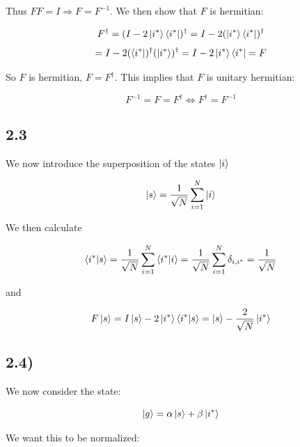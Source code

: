\documentclass[a4paper,norsk, 10pt]{article}
\begin{document}
Thus $FF = I \Rightarrow F = F^{-1}$. We then show that $F$ is hermitian:

\begin{equation}
F^\dagger = (I - 2\ket{i^*}\bra{i^*})^\dagger = I - 2(\ket{i^*}\bra{i^*})^\dagger
\end{equation}
\begin{equation}
= I - 2(\bra{i^*})^\dagger(\ket{i^*})^\dagger = I - 2\ket{i^*}\bra{i^*} = F
\end{equation}

So $F$ is hermitian, $F = F^\dagger$. This implies that $F$ is unitary hermitian:

\begin{equation}
F^{-1} = F = F^\dagger \Leftrightarrow F^\dagger = F^{-1}
\end{equation}


\subsection{2.3}
We now introduce the superposition of the states $\ket{i}$

\begin{equation}
\ket{s} = \frac{1}{\sqrt{N}} \sum_{i=1}^N \ket{i}
\end{equation}

We then calculate 

\begin{equation}
\braket{i^*}{s} = \frac{1}{\sqrt{N}} \sum_{i=1}^N \braket{i^*}{i} = \frac{1}{\sqrt{N}} \sum_{i=1}^N \delta_{i,i^*} = \frac{1}{\sqrt{N}} 
\end{equation}\label{eq:is}


and

\begin{equation}
F\ket{s} = I\ket{s} - 2\ket{i^*}\bra{i^*}\ket{s} = \ket{s} - \frac{2}{\sqrt{N}}\ket{i^*}
\end{equation}\label{eq:Fs}



\subsection{2.4)}

We now consider the state:

\begin{equation}
\ket{g} = \alpha \ket{s} + \beta\ket{i^*}
\end{equation}

We want this to be normalized:
\end{document}
